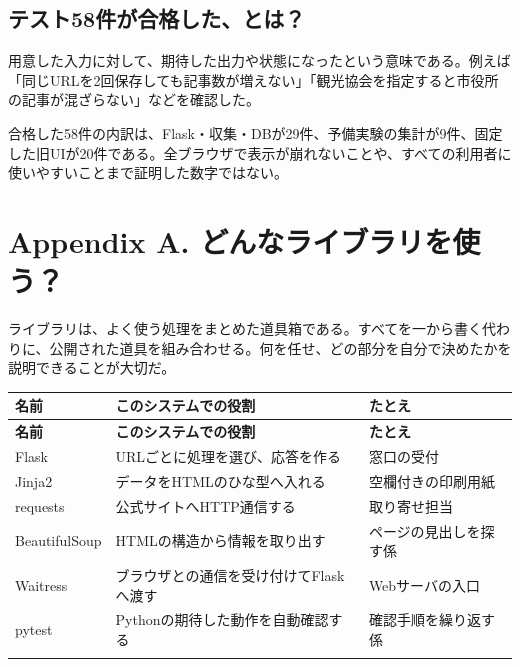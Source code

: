 \documentclass[a4paper,10pt]{ltjsarticle}
\begin{document}
\subsection*{テスト58件が合格した、とは？}

用意した入力に対して、期待した出力や状態になったという意味である。例えば「同じURLを2回保存しても記事数が増えない」「観光協会を指定すると市役所の記事が混ざらない」などを確認した。


合格した58件の内訳は、Flask・収集・DBが29件、予備実験の集計が9件、固定した旧UIが20件である。全ブラウザで表示が崩れないことや、すべての利用者に使いやすいことまで証明した数字ではない。


\clearpage

\section*{Appendix A. どんなライブラリを使う？}

ライブラリは、よく使う処理をまとめた道具箱である。すべてを一から書く代わりに、公開された道具を組み合わせる。何を任せ、どの部分を自分で決めたかを説明できることが大切だ。


{\small\begin{longtable}{@{}>{\raggedright\arraybackslash}p{}>{\raggedright\arraybackslash}p{}>{\raggedright\arraybackslash}p{}@{}}

\rowcolor{Pale}\textbf{名前} & \textbf{このシステムでの役割} & \textbf{たとえ} \\ \midrule

\endfirsthead

\rowcolor{Pale}\textbf{名前} & \textbf{このシステムでの役割} & \textbf{たとえ} \\ \midrule\endhead

Flask & URLごとに処理を選び、応答を作る & 窓口の受付 \\ \addlinespace[3pt]

Jinja2 & データをHTMLのひな型へ入れる & 空欄付きの印刷用紙 \\ \addlinespace[3pt]

requests & 公式サイトへHTTP通信する & 取り寄せ担当 \\ \addlinespace[3pt]

BeautifulSoup & HTMLの構造から情報を取り出す & ページの見出しを探す係 \\ \addlinespace[3pt]

Waitress & ブラウザとの通信を受け付けてFlaskへ渡す & Webサーバの入口 \\ \addlinespace[3pt]

pytest & Pythonの期待した動作を自動確認する & 確認手順を繰り返す係 \\ \addlinespace[3pt]

\bottomrule\end{longtable}}
\end{document}
